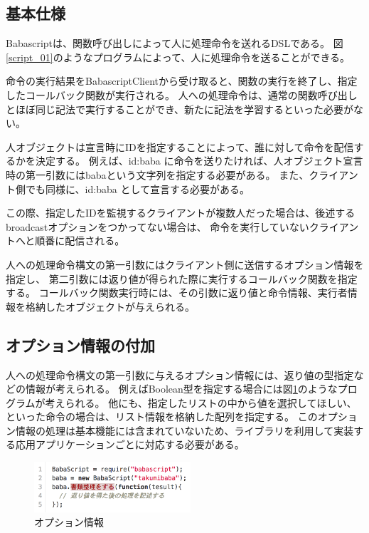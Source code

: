 \subsection{基本仕様}\label{ux57faux672cux4ed5ux69d8}

Babascriptは、関数呼び出しによって人に処理命令を送れるDSLである。
図\ref{script_01}のようなプログラムによって、人に処理命令を送ることができる。

命令の実行結果をBabascriptClientから受け取ると、関数の実行を終了し、指定したコールバック関数が実行される。
人への処理命令は、通常の関数呼び出しとほぼ同じ記法で実行することができ、新たに記法を学習するといった必要がない。

人オブジェクトは宣言時にIDを指定することによって、誰に対して命令を配信するかを決定する。
例えば、id:baba
に命令を送りたければ、人オブジェクト宣言時の第一引数にはbabaという文字列を指定する必要がある。
また、クライアント側でも同様に、id:baba として宣言する必要がある。

この際、指定したIDを監視するクライアントが複数人だった場合は、後述するbroadcastオプションをつかってない場合は、
命令を実行していないクライアントへと順番に配信される。

人への処理命令構文の第一引数にはクライアント側に送信するオプション情報を指定し、
第二引数には返り値が得られた際に実行するコールバック関数を指定する。
コールバック関数実行時には、その引数に返り値と命令情報、実行者情報を格納したオブジェクトが与えられる。

\subsection{オプション情報の付加}\label{ux30aaux30d7ux30b7ux30e7ux30f3ux60c5ux5831ux306eux4ed8ux52a0}

人への処理命令構文の第一引数に与えるオプション情報には、返り値の型指定などの情報が考えられる。
例えばBoolean型を指定する場合には図\ref{script_02}のようなプログラムが考えられる。
他にも、指定したリストの中から値を選択してほしい、といった命令の場合は、リスト情報を格納した配列を指定する。
このオプション情報の処理は基本機能には含まれていないため、ライブラリを利用して実装する応用アプリケーションごとに対応する必要がある。

\begin{figure}[h]
  \centering  
  \includegraphics[width=220px]{./images/script_02.png}
  \caption{オプション情報}
  \label{script_02}
\end{figure}

